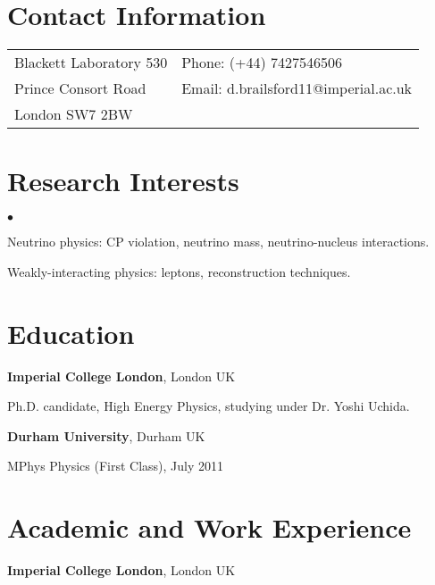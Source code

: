 \documentclass[margin,line]{res}
\newenvironment{list1}{
  \begin{list}{\ding{113}}{%
      \setlength{\itemsep}{0in}
      \setlength{\parsep}{0in} \setlength{\parskip}{0in}
      \setlength{\topsep}{0in} \setlength{\partopsep}{0in} 
      \setlength{\leftmargin}{0.17in}}}{\end{list}}
\newenvironment{list2}{
  \begin{list}{$\bullet$}{%
      \setlength{\itemsep}{0in}
      \setlength{\parsep}{0in} \setlength{\parskip}{0in}
      \setlength{\topsep}{0in} \setlength{\partopsep}{0in} 
      \setlength{\leftmargin}{0.2in}}}{\end{list}}
\begin{document}

\begin{resume}
\section{\sc Contact Information}
\vspace{.05in}
\begin{tabular}{@{}p{2in}p{4in}}
Blackett Laboratory 530          & { Phone:}  (+44) 7427546506\\
Prince Consort Road   & { Email:}    d.brailsford11@imperial.ac.uk \\      
London  SW7 2BW & \\   
\end{tabular}


\section{\sc Research Interests}
\begin{list2}
\item Neutrino physics: CP violation, neutrino mass, neutrino-nucleus interactions.
\item Weakly-interacting physics: leptons, reconstruction techniques.
\end{list2}

\section{\sc Education}
{\bf Imperial College London}, London UK\\
\vspace*{-.1in}
\begin{list1}
\item[] Ph.D. candidate, High Energy Physics, studying under Dr. Yoshi Uchida.
\end{list1}

{\bf Durham University}, Durham UK\\
\vspace*{-.1in}
\begin{list1}
\item[] MPhys Physics (First Class), July 2011
\end{list1}


\section{\sc Academic and Work Experience}
{\bf Imperial College London}, London UK


\end{resume}
\end{document}
